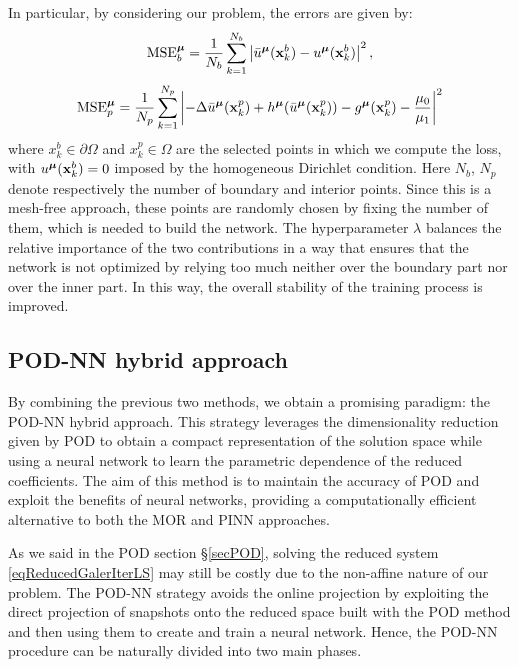 \documentclass[
    conference,
    nofonttune,
    11pt
]{IEEEtran}
\begin{document}
            
            In particular, by considering our problem, the errors are given by:
            \begin{equation*}
                \operatorname{MSE}^{\boldsymbol\mu}_b=\frac{1}{N_b}\sum_{k=1}^{N_b}\left|\bar u^{\boldsymbol\mu}(\mathbf x^b_k)-u^{\boldsymbol\mu}(\mathbf x^b_k)\right|^2,
            \end{equation*} 
            \begin{equation*}
               \operatorname{MSE}^{{\boldsymbol\mu}}_{p}=\frac{1}{N_p}\sum_{k=1}^{N_p} \left| -\Delta \bar u^{{\boldsymbol\mu}}(\mathbf x^p_k)+h^{\boldsymbol\mu}(\bar u^{{\boldsymbol\mu}}(\mathbf x^p_k)) -g^{{\boldsymbol\mu}}(\mathbf x^p_k)-\frac{\mu_0}{\mu_1}\right|^2
            \end{equation*}
            where $x^{b}_k \in \partial \Omega$ and $x^p_k \in \Omega$ are the selected points in which we compute the loss, with $u^{\boldsymbol\mu}(\mathbf x^b_k)=0$ imposed by the homogeneous Dirichlet condition. Here $N_b$, $N_p$ denote respectively the number of boundary and interior points. Since this is a mesh-free approach, these points are randomly chosen by fixing the number of them, which is needed to build the network.  
            The hyperparameter $\lambda$ balances the relative importance of the two contributions in a way that ensures that the network is not optimized by relying too much neither over the boundary part nor over the inner part. In this way, the overall stability of the training process is improved.
            
        \subsection{POD-NN hybrid approach}\label{secPODNN}
    
            By combining the previous two methods, we obtain a promising paradigm: the POD-NN hybrid approach. This strategy leverages the dimensionality reduction given by POD to obtain a compact representation of the solution space while using a neural network to learn the parametric dependence of the reduced coefficients. The aim of this method is to maintain the accuracy of POD and exploit the benefits of neural networks, providing a computationally efficient alternative to both the MOR and PINN approaches.

            As we said in the POD section \S{\ref{secPOD}}, solving the reduced system \eqref{eqReducedGalerIterLS} may still be costly due to the non-affine nature of our problem. The POD-NN strategy avoids the online projection by exploiting the direct projection of snapshots onto the reduced space built with the POD method and then using them to create and train a neural network. Hence, the POD-NN procedure can be naturally divided into two main phases.
            
\end{document}
